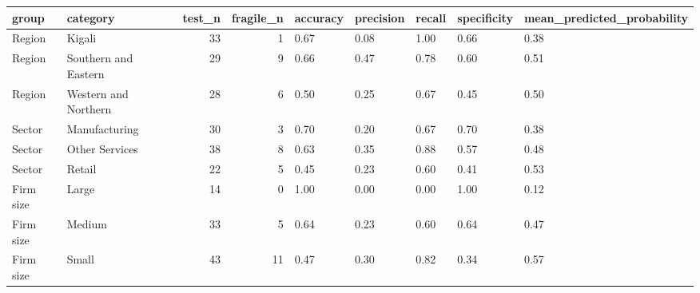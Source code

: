 \begin{tabular}{llrrlllll}
\toprule
group & category & test\_n & fragile\_n & accuracy & precision & recall & specificity & mean\_predicted\_probability \\
\midrule
Region & Kigali & 33 & 1 & 0.67 & 0.08 & 1.00 & 0.66 & 0.38 \\
Region & Southern and Eastern & 29 & 9 & 0.66 & 0.47 & 0.78 & 0.60 & 0.51 \\
Region & Western and Northern & 28 & 6 & 0.50 & 0.25 & 0.67 & 0.45 & 0.50 \\
Sector & Manufacturing & 30 & 3 & 0.70 & 0.20 & 0.67 & 0.70 & 0.38 \\
Sector & Other Services & 38 & 8 & 0.63 & 0.35 & 0.88 & 0.57 & 0.48 \\
Sector & Retail & 22 & 5 & 0.45 & 0.23 & 0.60 & 0.41 & 0.53 \\
Firm size & Large & 14 & 0 & 1.00 & 0.00 & 0.00 & 1.00 & 0.12 \\
Firm size & Medium & 33 & 5 & 0.64 & 0.23 & 0.60 & 0.64 & 0.47 \\
Firm size & Small & 43 & 11 & 0.47 & 0.30 & 0.82 & 0.34 & 0.57 \\
\bottomrule
\end{tabular}
